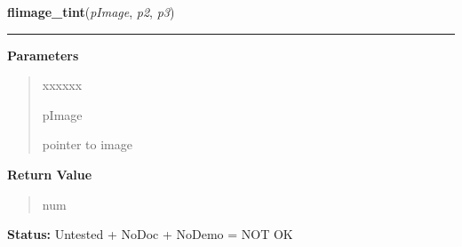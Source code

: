 \hspace{.8\funcindent}\begin{boxedminipage}{\funcwidth}

    \raggedright \textbf{flimage\_tint}(\textit{pImage}, \textit{p2}, \textit{p3})

    \vspace{-1.5ex}

    \rule{\textwidth}{0.5\fboxrule}
\setlength{\parskip}{2ex}
\setlength{\parskip}{1ex}
      \textbf{Parameters}
      \vspace{-1ex}

      \begin{quote}
        \begin{Ventry}{xxxxxx}

          \item[pImage]

          pointer to image

        \end{Ventry}

      \end{quote}

      \textbf{Return Value}
    \vspace{-1ex}

      \begin{quote}
      num

      \end{quote}

\textbf{Status:} Untested + NoDoc + NoDemo = NOT OK



    \end{boxedminipage}

    \label{xformslib:flflimage:flimage_rotate}

    \vspace{0.5ex}


